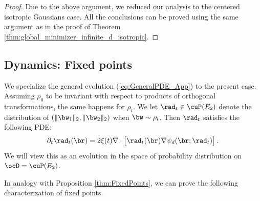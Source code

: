 \documentclass[11pt]{article}
\begin{document}
\begin{proof}
Due to the above argument, we reduced our analysis to the centered isotropic Gaussians case. All the conclusions can be proved using the same argument as in the proof of Theorem \ref{thm:global_minimizer_infinite_d_isotropic}. 



\end{proof}




\subsection{Dynamics: Fixed points}

We specialize the general evolution (\ref{eq:GeneralPDE_App}) to the present case. Assuming $\rho_0$ to be invariant with respect to products of orthogonal transformations, the same happens for $\rho_t$. We let $\rad_t \in \cuP(E_2)$ denote the distribution of $(\|\bw_1\|_2, \| \bw_2 \|_2)$ when $\bw\sim\rho_t$. Then $\rad_t$ satisfies the following PDE: 
%
\begin{align}
%
\partial_t\rad_t(\br) = 2\xi(t)\nabla \cdot \big[\rad_t(\br) \nabla \psi_d(\br ;\rad_t) \big]\, . \label{eq:PDERadialAnisotropic}
%
\end{align}
%
We will view this as an evolution in the space of probability distribution on $\ocD = \cuP(E_2)$.


In analogy with Proposition \ref{thm:FixedPoints}, we can prove the following characterization of fixed points.
\end{document}
